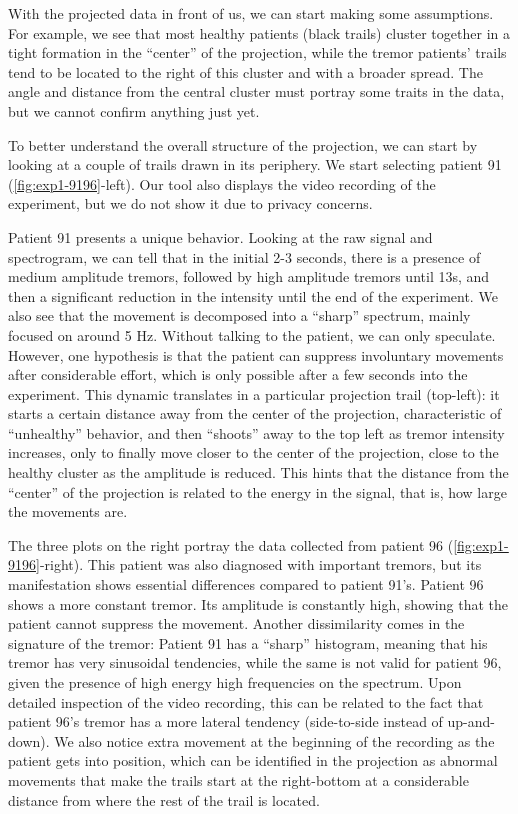 With the projected data in front of us, we can start making some assumptions. For example, we see that most healthy patients (black trails) cluster together in a tight formation in the ``center'' of the projection, while the tremor patients' trails tend to be located to the right of this cluster and with a broader spread. The angle and distance from the central cluster must portray some traits in the data, but we cannot confirm anything just yet.   

To better understand the overall structure of the projection, we can start by looking at a couple of trails drawn in its periphery. We start selecting patient 91 (\cref{fig:exp1-9196}-left). Our tool also displays the video recording of the experiment, but we do not show it due to privacy concerns. 

Patient 91 presents a unique behavior. Looking at the raw signal and spectrogram, we can tell that in the initial 2-3 seconds, there is a presence of medium amplitude tremors, followed by high amplitude tremors until 13s, and then a significant reduction in the intensity until the end of the experiment. We also see that the movement is decomposed into a ``sharp'' spectrum, mainly focused on around 5 Hz. Without talking to the patient, we can only speculate. However, one hypothesis is that the patient can suppress involuntary movements after considerable effort, which is only possible after a few seconds into the experiment. This dynamic translates in a particular projection trail (top-left): it starts a certain distance away from the center of the projection, characteristic of ``unhealthy'' behavior, and then ``shoots'' away to the top left as tremor intensity increases, only to finally move closer to the center of the projection, close to the healthy cluster as the amplitude is reduced. This hints that the distance from the ``center'' of the projection is related to the energy in the signal, that is, how large the movements are. 

The three plots on the right portray the data collected from patient 96 (\cref{fig:exp1-9196}-right). This patient was also diagnosed with important tremors, but its manifestation shows essential differences compared to patient 91's. Patient 96 shows a more constant tremor. Its amplitude is constantly high, showing that the patient cannot suppress the movement. Another dissimilarity comes in the signature of the tremor: Patient 91 has a ``sharp'' histogram, meaning that his tremor has very sinusoidal tendencies, while the same is not valid for patient 96, given the presence of high energy high frequencies on the spectrum. Upon detailed inspection of the video recording, this can be related to the fact that patient 96's tremor has a more lateral tendency (side-to-side instead of up-and-down).  We also notice extra movement at the beginning of the recording as the patient gets into position, which can be identified in the projection as abnormal movements that make the trails start at the right-bottom at a considerable distance from where the rest of the trail is located.  

